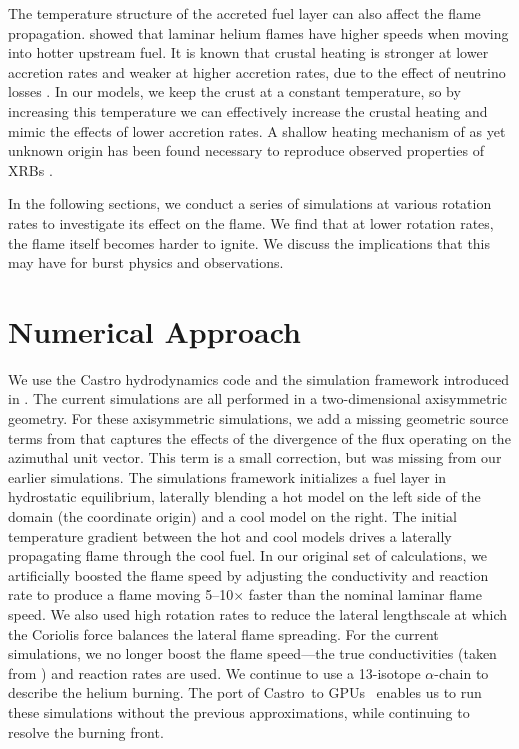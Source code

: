 \documentclass[preprint,times,tighten]{aastex63}
\newcommand{\castro}{{\sf Castro}}
\newcommand{\MarginPar}[1]{
    \marginpar{\vskip-\baselineskip%
               \raggedright%
               \tiny\sffamily%
               {\color{red}\hrule%
               \smallskip%
               #1\par%
               \smallskip%
               \hrule}}%
}
\begin{document}
The temperature structure of the accreted fuel layer can also affect
the flame propagation.  \citet{Timmes00} showed that laminar helium flames 
have higher speeds when moving into hotter upstream fuel.
It is known that crustal heating is stronger at lower
accretion rates and weaker at higher accretion rates, due to the
effect of neutrino losses \citep{Cumming2006,johnston:2019}. In our
models, we keep the crust at a constant temperature, so by increasing
this temperature we can effectively increase the crustal heating and
mimic the effects of lower accretion rates. A shallow heating
mechanism of as yet unknown origin has been found necessary to
reproduce observed properties of XRBs
\citep{Deibel2015,Turlione2015,Keek2017}.

In the following sections, we conduct a series of simulations at various rotation rates to investigate its effect on the flame. We find that at lower rotation rates, the flame itself becomes harder to ignite. We discuss the implications that this may have for burst physics and observations. 


\section{Numerical Approach}\label{Sec:numerics}
\MarginPar{mz}

We use the Castro hydrodynamics code \citep{castro,castro_joss} and
the simulation framework introduced in \citet{flame_wave1}.  The
current simulations are all performed in a two-dimensional
axisymmetric geometry.  For these axisymmetric simulations, we add a
missing geometric source terms from \citet{bernard-champmartin} that
captures the effects of the divergence of the flux operating on the
azimuthal unit vector.  This term is a small correction, but was
missing from our earlier simulations.  The simulations framework
initializes a fuel layer in hydrostatic equilibrium, laterally
blending a hot model on the left side of the domain (the coordinate
origin) and a cool model on the right.  The initial temperature
gradient between the hot and cool models drives a laterally
propagating flame through the cool fuel.  In our original set of
calculations, we artificially boosted the flame speed by adjusting the
conductivity and reaction rate to produce a flame moving 5--10$\times$
faster than the nominal laminar flame speed.  We also used high
rotation rates to reduce the lateral lengthscale at which the Coriolis
force balances the lateral flame spreading.  For the current
simulations, we no longer boost the flame speed---the true
conductivities (taken from \citealt{Timmes00}) and reaction rates are
used.  We continue to use a 13-isotope $\alpha$-chain to describe the
helium burning.  The port of \castro\ to GPUs~\citep{sc20_gpu} enables
us to run these simulations without the previous approximations, while
continuing to resolve the burning front.
\end{document}
